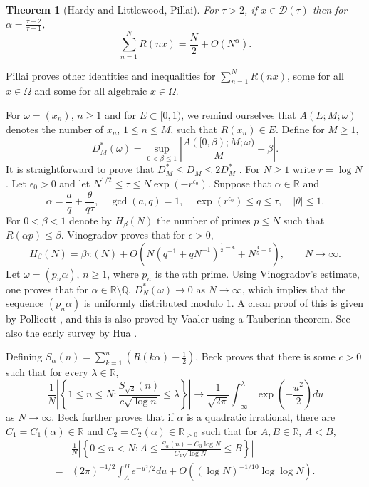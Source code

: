 \documentclass{amsart}
\newtheorem{theorem}{Theorem}
\begin{document}
\begin{theorem}[Hardy and Littlewood, Pillai]
For $\tau>2$, if $x \in \mathcal{D}(\tau)$ then for $\alpha = \frac{\tau-2}{\tau-1}$,
\[
\sum_{n=1}^N R(nx) = \frac{N}{2} + O(N^\alpha).
\]
\end{theorem}

Pillai \cite{pillai2} proves other identities and inequalities for  $\sum_{n=1}^N R(nx)$, some for all $x \in \Omega$ and some for all algebraic $x \in \Omega$. 



For $\omega=(x_n)$, $n \geq 1$ and for $E \subset [0,1)$, we remind ourselves that
$A(E;M;\omega)$ denotes the number of $x_n$, $1 \leq n \leq M$, such that $R(x_n) \in E$.
Define for $M \geq 1$,
\[
D_M^*(\omega) = \sup_{0<\beta \leq 1} \left| \frac{A([0,\beta);M;\omega)}{M}-\beta \right|.
\]
It is straightforward to prove that $D_M^* \leq D_M \leq 2D_M^*$ \cite[p.~91, Theorem 1.3]{kuipers}.
For $N \geq 1$ write $r=\log N$. Let $\epsilon_0>0$ and let
$N^{1/2} \leq \tau \leq N \exp(-r^{\epsilon_0})$. Suppose that $\alpha \in \mathbb{R}$ and 
\[
\alpha = \frac{a}{q} + \frac{\theta}{q\tau},\quad \gcd(a,q)=1,\quad \exp(r^{\epsilon_0}) \leq q \leq \tau,\quad |\theta| \leq 1.
\]
For $0<\beta<1$ denote by $H_\beta(N)$  the number of primes $p \leq N$ such that $R(\alpha p) \leq \beta$. 
Vinogradov \cite[p.~177, Chapter XI, Theorem]{vinogradov} proves that for $\epsilon>0$,
\[
H_\beta(N) = \beta \pi (N) + O(N(q^{-1}+qN^{-1})^{\frac{1}{2}-\epsilon} + N^{\frac{4}{5}+\epsilon}),
\qquad N \to \infty.
\]
Let $\omega=(p_n \alpha)$, $n \geq 1$, where $p_n$ is the $n$th prime. Using Vinogradov's estimate,
one proves that for $\alpha \in \mathbb{R} \setminus \mathbb{Q}$,
$D_N^*(\omega) \to 0$ as $N \to \infty$, which implies that the sequence $(p_n \alpha)$ is uniformly distributed modulo $1$.
A clean proof of this is given by Pollicott \cite[p.~200, Theorem 1]{pollicott},
and this is also
proved by Vaaler \cite{vaaler} using a Tauberian theorem. See also the early survey by 
Hua \cite[pp.~98--99, \S 38]{hua}.








Defining $S_\alpha(n)=\sum_{k=1}^n \left(R(k\alpha)-\frac{1}{2}\right)$, 
 Beck \cite[p.~14, Theorem 3.1]{beck} proves that there is some $c>0$ such that for every
 $\lambda \in \mathbb{R}$, 
 \[
 \frac{1}{N} \left| \left\{ 1 \leq n \leq N: \frac{S_{\sqrt{2}}(n)}{c\sqrt{\log n}} \leq \lambda 
 \right\} \right| \to \frac{1}{\sqrt{2\pi}} \int_{-\infty}^\lambda \exp\left(-\frac{u^2}{2}\right) du
 \]
 as $N \to \infty$. 
Beck \cite[p.~20, Theorem 1.2]{beck2014} further proves that if $\alpha$ is a quadratic irrational, there are
 $C_1=C_1(\alpha) \in \mathbb{R}$ and $C_2=C_2(\alpha) \in \mathbb{R}_{>0}$ such that for $A,B \in \mathbb{R}$, $A<B$,
\[
\begin{split}
&\frac{1}{N} \left| \left\{ 0 \leq n < N : A \leq \frac{S_\alpha(n)-C_3 \log N}{C_4 \sqrt{\log N}} \leq B\right\}\right|\\
=&(2\pi)^{-1/2} \int_A^B e^{-u^2/2} du + O((\log N)^{-1/10} \log \log N).
\end{split}
\]
\end{document}
